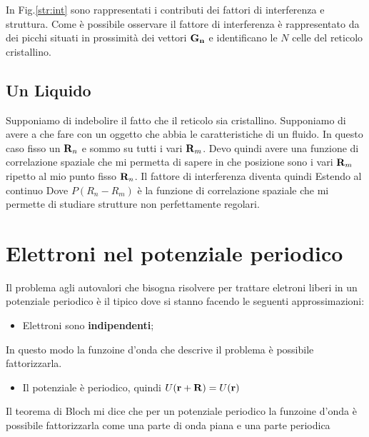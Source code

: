 \documentclass[a4paper,12pt]{article}
\begin{document}
In Fig.\ref{str:int} sono rappresentati i contributi dei fattori di interferenza e struttura. Come è possibile osservare il fattore di interferenza è rappresentato da dei picchi situati in prossimità dei vettori $\it\bf{G_n}$ e identificano le $N$ celle del reticolo cristallino.
\subsection{Un Liquido}
Supponiamo di indebolire il fatto che il reticolo sia cristallino. Supponiamo di avere a che fare con un oggetto che abbia le caratteristiche di un fluido. In questo caso fisso un ${\it\bf R} _n$ e sommo su tutti i vari ${\it\bf R} _m$. Devo quindi avere una funzione di correlazione spaziale che mi permetta di sapere in che posizione sono i vari ${\it\bf R} _m$ ripetto al mio punto fisso ${\it\bf R} _n$. Il fattore di interferenza diventa quindi 
Estendo al continuo
Dove $P(R_n-R_m)$ è la funzione di correlazione spaziale che mi permette di studiare strutture non perfettamente regolari.

\section{Elettroni nel potenziale periodico}
Il problema agli autovalori che bisogna risolvere per trattare eletroni liberi in un potenziale periodico è il tipico
dove si stanno facendo le seguenti approssimazioni:
\begin{itemize}
	\item Elettroni sono \textbf{indipendenti};
\end{itemize}
In questo modo la funzoine d'onda che descrive il problema è possibile fattorizzarla.
\begin{itemize}
	\item Il potenziale è periodico, quindi $U({\it\bf r}  + {\it\bf R} )  = U({\it\bf r}  )$
\end{itemize}
Il teorema di Bloch mi dice che per un potenziale periodico la funzoine d'onda è possibile fattorizzarla come una parte di onda piana e una parte periodica
\end{document}
